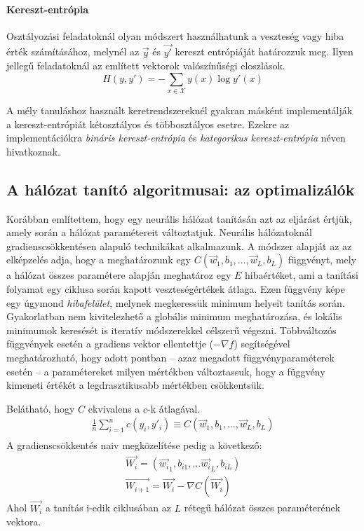 \paragraph{Kereszt-entrópia}
Osztályozási feladatoknál olyan módszert használhatunk a veszteség  vagy hiba érték számításához, melynél az $\vec{y}$ és $\vec{y'}$  kereszt entrópiáját határozzuk meg. Ilyen jellegű feladatoknál az említett vektorok valószínűségi eloszlások.
\begin{displaymath}
	H(y,y')= -\sum_{x\in \mathcal{X}}y(x)\log y'(x)
\end{displaymath}

A mély tanuláshoz használt keretrendszereknél gyakran másként implementálják a kereszt-entrópiát kétosztályos és többosztályos esetre. Ezekre az implementációkra \emph{bináris kereszt-entrópia} és \emph{kategorikus kereszt-entrópia} néven hivatkoznak.

\subsection{A hálózat tanító algoritmusai: az optimalizálók}
Korábban említettem, hogy egy neurális hálózat tanításán azt az eljárást értjük, amely során a hálózat paramétereit változtatjuk. Neurális hálózatoknál gradienscsökkentésen alapuló technikákat alkalmazunk. A módszer alapját az az elképzelés adja, hogy a meghatározunk egy $C(\vec{w}_1,b_1,\dots,\vec{w}_L,b_L)$ függvényt, mely a hálózat összes paramétere alapján meghatároz egy $E$ hibaértéket, ami a tanítási folyamat egy ciklusa során kapott veszteségértékek átlaga. Ezen függvény képe egy úgymond \emph{hibafelület}, melynek megkeressük  minimum helyeit tanítás során. Gyakorlatban nem kivitelezhető a globális minimum meghatározása, és lokális minimumok keresését is iteratív módszerekkel célszerű végezni. Többváltozós függvények esetén a gradiens vektor ellentettje ($-\nabla f$) segítségével meghatározható, hogy adott pontban -- azaz megadott függvényparaméterek esetén -- a paramétereket milyen mértékben változtassuk, hogy a függvény kimeneti értékét a legdrasztikusabb mértékben csökkentsük.

Belátható, hogy $C$ ekvivalens a $c$-k átlagával.
\begin{align*}
\frac{1}{n}\sum_{i=1}^{n}c(y_i,y'_i) \equiv C(\vec{w}_1,b_1,\dots,\vec{w}_L,b_L)\\
\end{align*}
A gradienscsökkentés naiv megközelítése pedig a következő:
\begin{align*}
	\vec{W_i}=(\vec{w_i}_1,b_{i1},\dots\vec{w_i}_L,b_{iL})\\
	\vec{W_{i+1}} = \vec{W_i} - \nabla C(\vec{W_i})
\end{align*}
Ahol $\vec{W_i}$ a tanítás i-edik ciklusában az $L$ rétegű hálózat összes paraméterének vektora.

